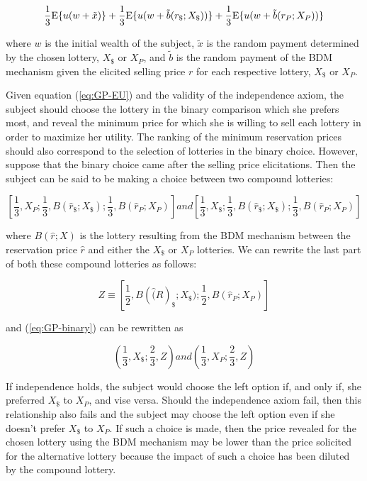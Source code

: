 \documentclass[../main.tex]{subfiles}
\begin{document}
\begin{equation}
	\label{eq:GP-EU}
	\frac{1}{3}{\operatorname{E}}{\lbrace} u(w+\tilde{x}){\rbrace} + \frac{1}{3}{\operatorname{E}}{\lbrace} u(w+\tilde{b}(r_{\$};X_{\$})){\rbrace} + \frac{1}{3}{\operatorname{E}}{\lbrace} u(w+\tilde{b}(r_P;X_P)){\rbrace}
\end{equation}

\noindent where $w$ is the initial wealth of the subject, $\tilde{x}$ is the random payment determined by the chosen lottery, $X_{\$}$ or $X_P$, and $\tilde{b}$ is the random payment of the BDM mechanism given the elicited selling price $r$ for each respective lottery, $X_{\$}$ or $X_P$.

Given equation (\ref{eq:GP-EU}) and the validity of the independence axiom, the subject should choose the lottery in the binary comparison which she prefers most, and reveal the minimum price for which she is willing to sell each lottery in order to maximize her utility.
The ranking of the minimum reservation prices should also correspond to the selection of lotteries in the binary choice.
However, suppose that the binary choice came after the selling price elicitations.
Then the subject can be said to be making a choice between two compound lotteries:

\begin{equation}
	\label{eq:GP-binary}
	\left[ \frac{1}{3},X_P;\frac{1}{3},B(\hat{r}_{\$} ; X_{\$}) ; \frac{1}{3}, B(\hat{r}_P ; X_P)\right]   \textit{and}   \left[ \frac{1}{3},X_{\$};\frac{1}{3},B(\hat{r}_{\$} ; X_{\$}) ; \frac{1}{3}, B(\hat{r}_P ; X_P) \right]
\end{equation}

\noindent where $B(\hat{r};X)$ is the lottery resulting from the BDM mechanism between the reservation price $\hat{r}$ and either the $X_{\$}$ or $X_P$ lotteries.
We can rewrite the last part of both these compound lotteries as follows:

\begin{equation}
	Z \equiv \left[ \frac{1}{2}, B(\hat(R)_{\$};X_{\$})  ; \frac{1}{2},B(\hat{r}_P ; X_P)  \right]
\end{equation}

\noindent and (\ref{eq:GP-binary}) can be rewritten as

\begin{equation}
	\label{eq:GP-bin-reduced}
	\left( \frac{1}{3}, X_{\$} ; \frac{2}{3},Z \right) \textit{and} \left( \frac{1}{3},X_P ; \frac{2}{3},Z  \right)
\end{equation}

If independence holds, the subject would choose the left option if, and only if, she preferred $X_{\$}$ to $X_P$, and vise versa.
Should the independence axiom fail, then this relationship also fails and the subject may choose the left option even if she doesn't prefer $X_{\$}$ to $X_P$.
If such  a choice is made, then the price revealed for the chosen lottery using the BDM mechanism may be lower than the price solicited for the alternative lottery because the impact of such a choice has been diluted by the compound lottery. 
\end{document}
